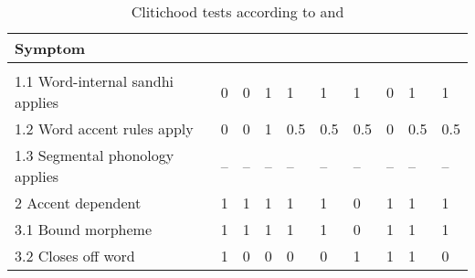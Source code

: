 \begin{table}[p]
\caption{Clitichood tests according to \citet{klavans1985} and 
	\citet{zwicky1985}}
\smaller
\begin{tabu} to \linewidth {H[10l] X[c] X[c] X[c] X[c] X[c] X[c] X[c] X[c] X[c]}
\toprule\tableheaderfont

Symptom
	& 
	& 
	& 
	& 
	& 
	& 
	& 
	& 
	& 
	\\

\toprule
\tableheaderfont{} \\
\toprule

1.1 Word-internal sandhi applies
	& 0	%
	& 0	%
	& 1	%
	& 1	%
	& 1	%
	& 1	%
	& 0	%
	& 1	%
	& 1	%
	\\ \midrule

1.2 Word accent rules apply
	& 0	%
	& 0	%
	& 1	%
	& 0.5	%
	& 0.5	%
	& 0.5	%
	& 0	%
	& 0.5	%
	& 0.5	%
	\\ \midrule

1.3 Segmental phonology applies
	& --	%
	& --	%
	& --	%
	& --	%
	& --	%
	& --	%
	& --	%
	& --	%
	& --	%
	\\ \midrule

2 Accent dependent
	& 1	%
	& 1	%
	& 1	%
	& 1	%
	& 1	%
	& 0	%
	& 1	%
	& 1	%
	& 1	%
	\\ \midrule

3.1 Bound morpheme
	& 1	%
	& 1	%
	& 1	%
	& 1	%
	& 1	%
	& 0	%
	& 1	%
	& 1	%
	& 1	%
	\\ \midrule

3.2 Closes off word
	& 1	%
	& 0	%
	& 0	%
	& 0	%
	& 0	%
	& 1	%
	& 1	%
	& 1	%
	& 0	%
	\\ \midrule


\end{tabu}
\end{table}

